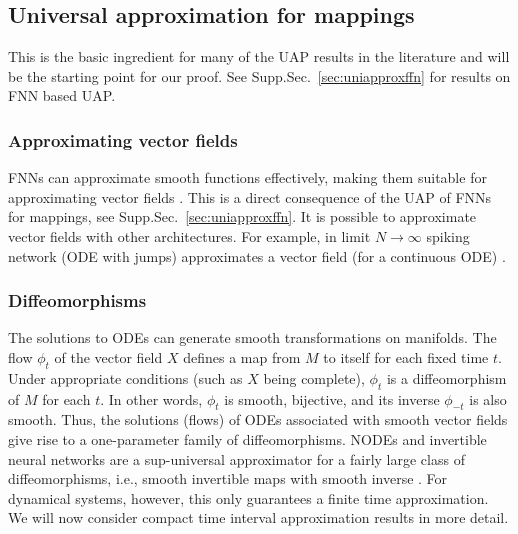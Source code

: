 \documentclass{article}
\theoremstyle{definition} \newtheorem{definition}{Definition}
\theoremstyle{remark} \newtheorem{remark}{Remark}
\newcounter{ct}
\begin{document}


\subsection{Universal approximation for mappings}\label{sec:uapmappings}
This is the basic ingredient for many of the UAP results in the literature and will be the starting point for our proof.
See Supp.Sec.~\ref{sec:uniapproxffn} for results on FNN based UAP.


\subsubsection{Approximating vector fields}\label{sec:uapvfs}
 FNNs can approximate smooth functions effectively, making them suitable for approximating vector fields \citep{doya1993universality}.
This is a direct consequence of the UAP of FNNs for mappings, see Supp.Sec.~\ref{sec:uniapproxffn}.
%
It is possible to approximate vector fields with other architectures.
For example, in limit $N\rightarrow\infty$ spiking network (ODE with jumps) approximates a vector field (for a continuous ODE) \citep{podlaski2024approximating}. 


\subsubsection{Diffeomorphisms}%
The solutions to ODEs can generate smooth transformations on manifolds.
The flow \( \phi_t \) of the vector field \( X \) defines a map from \( M \) to itself for each fixed time \( t \). Under appropriate conditions (such as \( X \) being complete), \( \phi_t \) is a diffeomorphism of \( M \) for each \( t \). In other words, \( \phi_t \) is smooth, bijective, and its inverse \( \phi_{-t} \) is also smooth.
Thus, the solutions (flows) of ODEs associated with smooth vector fields give rise to a one-parameter family of diffeomorphisms.
%
NODEs and invertible neural networks are a sup-universal approximator for a fairly large class of diffeomorphisms, i.e., smooth invertible maps with smooth inverse \citep{huang2018neural, jaini2019sum, teshima2020uap, teshima2020coupling, ishikawa2023uap}.
For dynamical systems, however, this only guarantees a finite time approximation.
We will now consider compact time interval approximation results in more detail.
\end{document}
